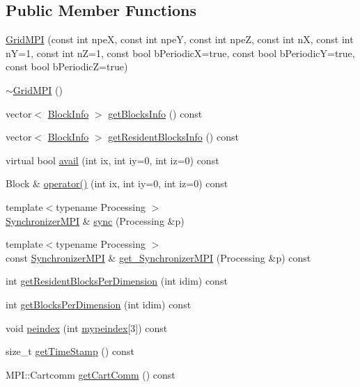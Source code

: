 \subsection*{Public Member Functions}
\begin{DoxyCompactItemize}
\item 
\hyperlink{class_grid_m_p_i_ad515efd9d7bd9560eed5e958950cbb4d}{Grid\+M\+P\+I} (const int npe\+X, const int npe\+Y, const int npe\+Z, const int n\+X, const int n\+Y=1, const int n\+Z=1, const bool b\+Periodic\+X=true, const bool b\+Periodic\+Y=true, const bool b\+Periodic\+Z=true)
\item 
\hyperlink{class_grid_m_p_i_a22874a9873aacbc4813f8f47606c89b6}{$\sim$\+Grid\+M\+P\+I} ()
\item 
vector$<$ \hyperlink{struct_block_info}{Block\+Info} $>$ \hyperlink{class_grid_m_p_i_abd9d87482f590729369816a9191fec90}{get\+Blocks\+Info} () const 
\item 
vector$<$ \hyperlink{struct_block_info}{Block\+Info} $>$ \hyperlink{class_grid_m_p_i_ae68d98fcfc60a139a468b2b66743a815}{get\+Resident\+Blocks\+Info} () const 
\item 
virtual bool \hyperlink{class_grid_m_p_i_a09fb63dc01bf37404fbce026dc52f8da}{avail} (int ix, int iy=0, int iz=0) const 
\item 
Block \& \hyperlink{class_grid_m_p_i_ae21841fb3c6ff3127647610a62388b6d}{operator()} (int ix, int iy=0, int iz=0) const 
\item 
{\footnotesize template$<$typename Processing $>$ }\\\hyperlink{class_synchronizer_m_p_i}{Synchronizer\+M\+P\+I} \& \hyperlink{class_grid_m_p_i_adbd8d6fb9ec2dd16e9a8317fa573d000}{sync} (Processing \&p)
\item 
{\footnotesize template$<$typename Processing $>$ }\\const \hyperlink{class_synchronizer_m_p_i}{Synchronizer\+M\+P\+I} \& \hyperlink{class_grid_m_p_i_ae57bf08859c39ed4ea3ee3031b289352}{get\+\_\+\+Synchronizer\+M\+P\+I} (Processing \&p) const 
\item 
int \hyperlink{class_grid_m_p_i_a2d743c8605ca373df9f174b350c06d76}{get\+Resident\+Blocks\+Per\+Dimension} (int idim) const 
\item 
int \hyperlink{class_grid_m_p_i_aad5685d311020dd70b9af3b08f51450f}{get\+Blocks\+Per\+Dimension} (int idim) const 
\item 
void \hyperlink{class_grid_m_p_i_afc77b34860081db4e179c6bd5ec4a04c}{peindex} (int \hyperlink{class_grid_m_p_i_a18aa2c80d121cc50339949d8c3d0d547}{mypeindex}\mbox{[}3\mbox{]}) const 
\item 
size\+\_\+t \hyperlink{class_grid_m_p_i_a225c750fb4e70ed908fb8ec485b31762}{get\+Time\+Stamp} () const 
\item 
M\+P\+I\+::\+Cartcomm \hyperlink{class_grid_m_p_i_a0368859fa3e4d49b1a6a52daa5789712}{get\+Cart\+Comm} () const 
\end{DoxyCompactItemize}
